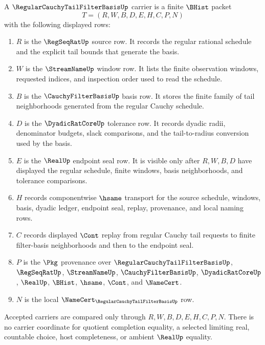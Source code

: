 \begin{definition}
\label{def:regular-cauchy-tail-filter-basis-carrier}
A $\RegularCauchyTailFilterBasisUp$ carrier is a finite $\BHist$ packet
$$
T=(R,W,B,D,E,H,C,P,N)
$$
with the following displayed rows:
\begin{enumerate}
\item $R$ is the $\RegSeqRatUp$ source row. It records the regular rational schedule and the explicit tail bounds that generate the basis.
\item $W$ is the $\StreamNameUp$ window row. It lists the finite observation windows, requested indices, and inspection order used to read the schedule.
\item $B$ is the $\CauchyFilterBasisUp$ basis row. It stores the finite family of tail neighborhoods generated from the regular Cauchy schedule.
\item $D$ is the $\DyadicRatCoreUp$ tolerance row. It records dyadic radii, denominator budgets, slack comparisons, and the tail-to-radius conversion used by the basis.
\item $E$ is the $\RealUp$ endpoint seal row. It is visible only after $R,W,B,D$ have displayed the regular schedule, finite windows, basis neighborhoods, and tolerance comparisons.
\item $H$ records componentwise $\hsame$ transport for the source schedule, windows, basis, dyadic ledger, endpoint seal, replay, provenance, and local naming rows.
\item $C$ records displayed $\Cont$ replay from regular Cauchy tail requests to finite filter-basis neighborhoods and then to the endpoint seal.
\item $P$ is the $\Pkg$ provenance over $\RegularCauchyTailFilterBasisUp$, $\RegSeqRatUp$, $\StreamNameUp$, $\CauchyFilterBasisUp$, $\DyadicRatCoreUp$, $\RealUp$, $\BHist$, $\hsame$, $\Cont$, and $\NameCert$.
\item $N$ is the local $\NameCert_{\RegularCauchyTailFilterBasisUp}$ row.
\end{enumerate}
Accepted carriers are compared only through $R,W,B,D,E,H,C,P,N$. There is no carrier coordinate for quotient completion equality, a selected limiting real, countable choice, host completeness, or ambient $\RealUp$ equality.
\end{definition}

